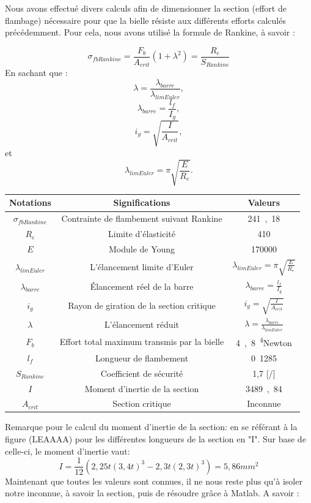 \documentclass{article}
\begin{document}
Nous avons effectué divers calculs afin de dimensionner la section (effort de flambage) nécessaire pour que la bielle résiste aux différents efforts calculés précédemment. Pour cela, nous avons utilisé la formule de Rankine, à savoir : 
{$$\sigma_{fb Rankine} = \frac{F_b}{A_{crit}}(1+\lambda^2) = \frac{R_e}{S_{Rankine}}$$
En sachant que : 
$$ \lambda = \frac{\lambda_{barre}}{\lambda_{lim Euler}}, $$
$$ \lambda_{barre} = \frac{l_{f}}{I_g},$$
$$ i_g = \sqrt{\frac{I}{A_{crit}}},$$ 
et
$$ \lambda_{lim Euler} = \pi \sqrt{\frac{E}{R_e}}.$$
\begin{center}
 \begin{tabular}{|c|c|c|}

        \hline
    		\textbf{Notations}&\textbf{Significations}&\textbf{Valeurs}\\
		\hline 
		$\sigma_{fb Rankine}$ & Contrainte de flambement suivant Rankine & \unit{241,18}{} \\ 
		\hline 
		$R_e$ & Limite d'élasticité & \unit{410}{\pascal} \\ 
		\hline 
		$E$ & Module de Young & \unit{170000}{\pascal} \\ 
		\hline 
		$\lambda_{lim Euler}$ & L'élancement limite d'Euler & $ \lambda_{lim Euler} = \pi \sqrt{\frac{E}{R_e}}$ \\ 
		\hline 
		$\lambda_{barre}$ & Élancement réel de la barre & $ \lambda_{barre} = \frac{l_{f}}{I_g}$\\
		\hline 
		$i_g$ & Rayon de giration de la section critique & $ i_g = \sqrt{\frac{I}{A_{crit}}}$ \\
		\hline 
		$\lambda$ & L'élancement réduit & $ \lambda = \frac{\lambda_{barre}}{\lambda_{lim Euler}} $ \\
		\hline 
		$F_b$ & Effort total maximum transmis par la bielle & \unit{4,8\cdot 10^4}{Newton}\\
		\hline 
		$l_f$ & Longueur de flambement & \unit{0.1285}{} \\
		\hline 
		$S_{Rankine}$ & Coefficient de sécurité & {1,7} [/] \\
		\hline 
		$I$ & Moment d'inertie de la section & \unit{3489,84}{\pascal} \\
		\hline
		$A_{crit}$ & Section critique & Inconnue\\
		\hline 
\end{tabular}
\end{center}		
Remarque pour le calcul du moment d'inertie de la section: en se référant à la figure (LEAAAA) pour les différentes longueurs de la section en "I". Sur base de celle-ci, le moment d'inertie vaut:
$$ I = \frac{1}{12} (2,25t (3,4t)^3 - 2,3t (2,3t)^3) = \unit{5,86}{mm^2}$$
Maintenant que toutes les valeurs sont connues, il ne nous reste plus qu'à isoler notre inconnue, à savoir la section, puis de résoudre grâce à Matlab. A savoir : 

}
\end{document}
